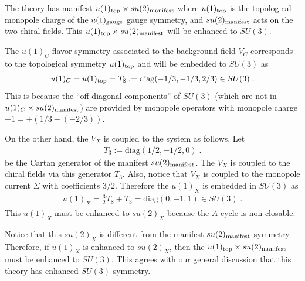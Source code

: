 \documentclass[a4paper,11pt]{article}
\begin{document}
The theory has manifest $u(1)_{\rm top} \times su(2)_{\rm manifest}$ where $u(1)_{\rm top} $ is the topological monopole charge of the $u(1)_{\rm gauge}$ gauge symmetry,
and $su(2)_{\rm manifest}$ acts on the two chiral fields.
This $u(1)_{\rm top} \times su(2)_{\rm manifest}$ will be enhanced to $SU(3)$.   

The $u(1)_{C}$ flavor symmetry associated to the background field $V_C$
corresponds to the topological symmetry $u(1)_{\rm top}$ and will be embedded to $SU(3)$ as 
%
\begin{align}
u(1)_C = u(1)_{\rm top}= T_8 := \textrm{diag}(-1/3, -1/3, 2/3) \in SU(3)\;.
\end{align}
%
This is because the ``off-diagonal components'' of $SU(3)$ (which are not in $u(1)_{C}\times su(2)_{\rm manifest}$) are 
provided by monopole operators with monopole charge $\pm 1 = \pm (1/3 - (-2/3))$. 

On the other hand, the $V_X$ is coupled to the system as follows. Let
%
\begin{align}
T_3:=\textrm{diag}(1/2,-1/2,0)\;.
\end{align}
%
be the Cartan generator of the manifest $su(2)_{\rm manifest}$. The $V_X$ is coupled to the chiral fields via this generator $T_3$.
Also, notice that $V_X$ is coupled to the monopole current $\Sigma$ with coefficients $3/2$. 
Therefore the $u(1)_{X} $ is embedded in $SU(3)$ as 
%
\begin{align}
u(1)_X =  \frac{3}2 T_8+T_3 = \textrm{diag} (0,-1,1) \in SU(3)\;.
\end{align}
%
This $u(1)_X$ must be enhanced to $su(2)_X$ because the $A$-cycle is non-closable. 

Notice that this $su(2)_X$ is different from the manifest $su(2)_{\rm manifest}$ symmetry.
Therefore, if $u(1)_X$ is enhanced to $su(2)_X$, then the $u(1)_{\rm top}\times su(2)_{\rm manifest}$ must be enhanced to $SU(3)$.
This agrees with our general discussion that this theory has enhanced $SU(3)$ symmetry.
\end{document}
